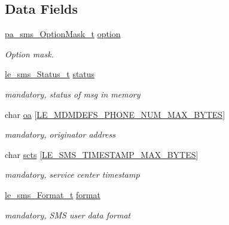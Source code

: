 \subsection*{Data Fields}
\begin{DoxyCompactItemize}
\item 
\hyperlink{pa__sms_8h_a0d21a7f97dc7168c576a14f98088eda0}{pa\+\_\+sms\+\_\+\+Option\+Mask\+\_\+t} \hyperlink{structpa__sms___sms_deliver__t_a5368c77dd6eaf826cb0182acb18a9b03}{option}
\begin{DoxyCompactList}\small\item\em Option mask. \end{DoxyCompactList}\item 
\hyperlink{le__sms__interface_8h_a18a1937acb5878ae01a9d668fe5070b6}{le\+\_\+sms\+\_\+\+Status\+\_\+t} \hyperlink{structpa__sms___sms_deliver__t_a1a6aaecb73364ea1fc01b07529ef3225}{status}
\begin{DoxyCompactList}\small\item\em mandatory, status of msg in memory \end{DoxyCompactList}\item 
char \hyperlink{structpa__sms___sms_deliver__t_a6407ae8bc0f03bef706c39c99b04c36f}{oa} \mbox{[}\hyperlink{le__mdm_defs__interface_8h_ae6d4a4c7892f14d1e340f8df083d479f}{L\+E\+\_\+\+M\+D\+M\+D\+E\+F\+S\+\_\+\+P\+H\+O\+N\+E\+\_\+\+N\+U\+M\+\_\+\+M\+A\+X\+\_\+\+B\+Y\+T\+ES}\mbox{]}
\begin{DoxyCompactList}\small\item\em mandatory, originator address \end{DoxyCompactList}\item 
char \hyperlink{structpa__sms___sms_deliver__t_acd8f2f1d84041df813524876ed242e14}{scts} \mbox{[}\hyperlink{le__sms__interface_8h_a9844280f515fbc2b393844e63aa83075}{L\+E\+\_\+\+S\+M\+S\+\_\+\+T\+I\+M\+E\+S\+T\+A\+M\+P\+\_\+\+M\+A\+X\+\_\+\+B\+Y\+T\+ES}\mbox{]}
\begin{DoxyCompactList}\small\item\em mandatory, service center timestamp \end{DoxyCompactList}\item 
\hyperlink{le__sms__interface_8h_a337778c44e63660c44fa2116699296c0}{le\+\_\+sms\+\_\+\+Format\+\_\+t} \hyperlink{structpa__sms___sms_deliver__t_a86cdc2ed066543089f73825a511d3b06}{format}
\begin{DoxyCompactList}\small\item\em mandatory, S\+MS user data format \end{DoxyCompactList}\item 

\end{DoxyCompactItemize}
